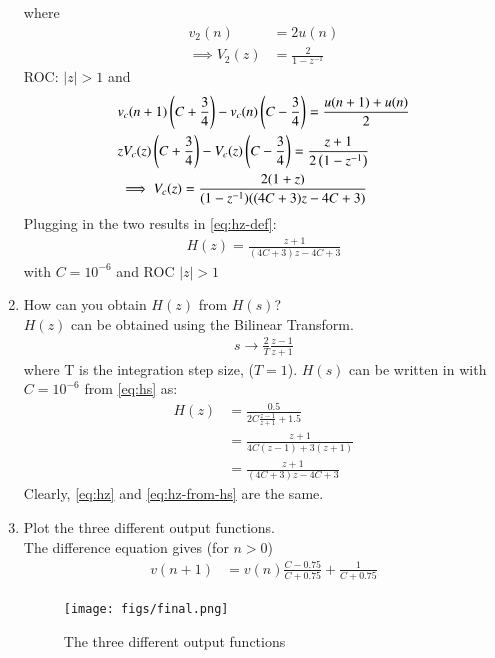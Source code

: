\documentclass[journal,12pt,twocolumn]{IEEEtran}
\renewcommand\thesection{\arabic{section}}
\begin{document}
\begin{enumerate}[label=\arabic*.,ref=\thesection.\theenumi]
	where
	\begin{align}
	    v_2(n) &= 2u(n)\\
	    \implies V_2(z) &= \frac{2}{1-z^{-1}}
	\end{align}
	ROC: $|z|>1$
	and
	\begin{align}
	    &v_c(n+1)\left(C+\frac{3}{4}\right)-v_c(n)\left(C-\frac{3}{4}\right)= \frac{u(n+1)+u(n)}{2}\\
	    &zV_c(z)\left(C+\frac{3}{4}\right)-V_c(z)\left(C-\frac{3}{4}\right)= \frac{z+1}{2\left(1-z^{-1}\right)}\\
	    &\implies V_c(z) = \frac{2(1+z)}{(1-z^{-1})((4C+3)z-4C+3)}
	\end{align}
	Plugging in the two results in \eqref{eq:hz-def}:
\begin{align}
    H(z) =\frac{z+1}{(4C+3)z-4C+3} \label{eq:hz}
\end{align}
with $C=10^{-6}$ and ROC $|z|>1$
	\item How can you obtain $H(z)$ from $H(s)$?
	\\\solution $H(z)$ can be obtained using the Bilinear Transform.
	\begin{align}
	    s \longrightarrow \frac{2}{T}\frac{z-1}{z+1}
	\end{align}
	where T is the integration step size, ($T=1$). $H(s)$ can be written in with $C=10^{-6}$ from \eqref{eq:hs} as:
	\begin{align}
	    H(z) &= \frac{0.5}{2C\frac{z-1}{z+1}+1.5}\\
	    &= \frac{z+1}{4C(z-1)+3(z+1)}\\
	    &= \frac{z+1}{(4C+3)z-4C+3}\label{eq:hz-from-hs}
	\end{align}
	Clearly, \eqref{eq:hz} and \eqref{eq:hz-from-hs} are the same.
\item Plot the three different output functions. \\\solution
	The difference equation gives (for $n>0$)
	\begin{align}
	v(n+1) &= v(n)\frac{C-0.75}{C+0.75}+\frac{1}{C+0.75}
		\end{align} 
\begin{figure}[h!]
	    \centering
	    \texttt{[image: figs/final.png]}
	    \caption{The three different output functions}
	    \label{fig:final}
	\end{figure}
\end{enumerate}
\end{document}
